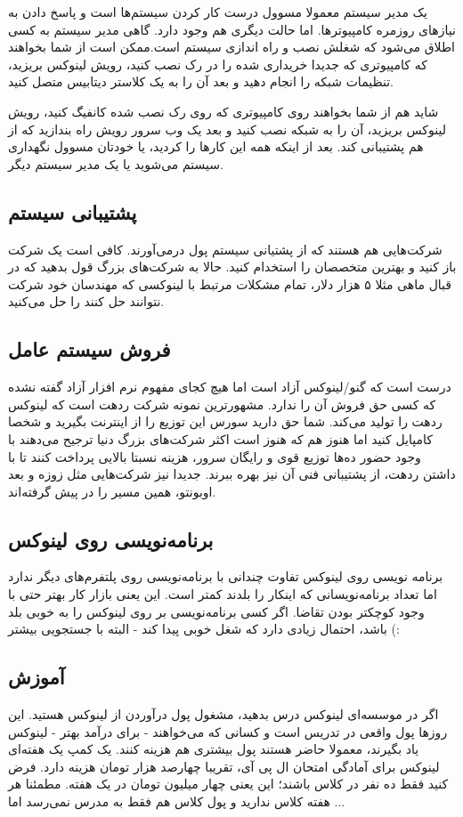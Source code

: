 یک مدیر سیستم معمولا مسوول درست کار کردن سیستم‌ها است و پاسخ دادن به نیازهای روزمره کامپیوترها. اما حالت دیگری هم وجود دارد. گاهی مدیر سیستم به کسی اطلاق می‌شود که شغلش نصب و راه اندازی سیستم است.ممکن است از شما بخواهند که کامپیوتری که جدیدا خریداری شده را در رک نصب کنید، رویش لینوکس بریزید، تنظیمات شبکه را انجام دهید و بعد آن را به یک کلاستر دیتابیس متصل کنید.

شاید هم از شما بخواهند روی کامپیوتری که روی رک نصب شده 
کانفیگ کنید، رویش لینوکس بریزید، آن را به شبکه نصب کنید و بعد یک وب سرور رویش راه بندازید که از 
هم پشتیبانی کند. بعد از اینکه همه این کارها را کردید، یا خودتان مسوول نگهداری سیستم می‌شوید یا یک مدیر سیستم دیگر.
\subsection*{پشتیبانی سیستم}
شرکت‌هایی هم هستند که از پشتیانی سیستم پول درمی‌آورند. کافی است یک شرکت باز کنید و بهترین متخصصان را استخدام کنید. حالا به شرکت‌های بزرگ قول بدهید که در قبال ماهی مثلا ۵ هزار دلار، تمام مشکلات مرتبط با لینوکسی که مهندسان خود شرکت نتوانند حل کنند را حل می‌کنید.
\subsection*{فروش سیستم عامل}
درست است که گنو/لینوکس آزاد است اما هیچ کجای مفهوم نرم افزار آزاد گفته نشده که کسی حق فروش آن را ندارد. مشهورترین نمونه شرکت ردهت است که لینوکس ردهت را تولید می‌کند. شما حق دارید سورس این توزیع را از اینترنت بگیرید و شخصا کامپایل کنید اما هنوز هم که هنوز است اکثر شرکت‌های بزرگ دنیا ترجیح می‌دهند با وجود حضور ده‌ها توزیع قوی و رایگان سرور، هزینه نسبتا بالایی پرداخت کنند تا با داشتن ردهت، از پشتیبانی فنی آن نیز بهره ببرند. جدیدا نیز شرکت‌هایی مثل زوزه و بعد اوبونتو، همین مسیر را در پیش گرفته‌اند.
\subsection*{برنامه‌نویسی روی لینوکس}
برنامه نویسی روی لینوکس تفاوت چندانی با برنامه‌نویسی روی پلتفرم‌های دیگر ندارد اما تعداد برنامه‌نویسانی که اینکار را بلدند کمتر است. این یعنی بازار کار بهتر حتی با وجود کوچکتر بودن تقاضا. اگر کسی برنامه‌نویسی بر روی لینوکس را به خوبی بلد باشد، احتمال زیادی دارد که شغل خوبی پیدا کند - البته با جستجویی بیشتر (:
\subsection*{آموزش}
اگر در موسسه‌ای لینوکس درس بدهید، مشغول پول درآوردن از لینوکس هستید. این روزها پول واقعی در تدریس است و کسانی که می‌خواهند - برای درآمد بهتر - لینوکس یاد بگیرند، معمولا حاضر هستند پول بیشتری هم هزینه کنند. یک کمپ یک هفته‌ای لینوکس برای آمادگی امتحان ال پی آی، تقریبا چهارصد هزار تومان هزینه دارد. فرض کنید فقط ده نفر در کلاس باشند؛ این یعنی چهار میلیون تومان در یک هفته. مطمئنا هر هفته کلاس ندارید و پول کلاس هم فقط به مدرس نمی‌رسد اما ...
